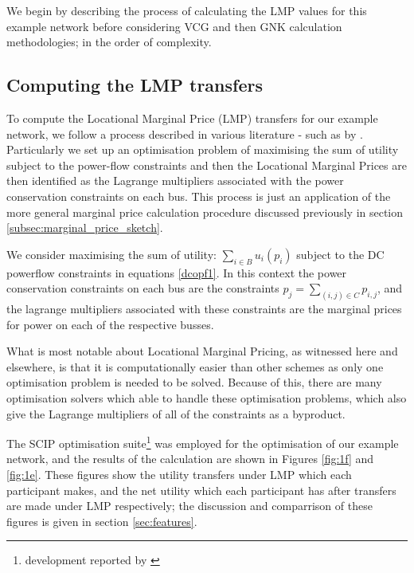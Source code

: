 We begin by describing the process of calculating the LMP values for this example network before considering VCG and then GNK calculation methodologies; in the order of complexity.





\subsection{Computing the LMP transfers}\label{subsec:LMP_compute1}

To compute the Locational Marginal Price (LMP) transfers for our example network, we follow a process described in various literature - such as by \cite{lmp1,lmp2}.
Particularly we set up an optimisation problem of maximising the sum of utility subject to the power-flow constraints and then the Locational Marginal Prices are then identified as the Lagrange multipliers associated with the power conservation constraints on each bus.
This process is just an application of the more general marginal price calculation procedure discussed previously in section \ref{subsec:marginal_price_sketch}.

We consider maximising the sum of utility: $\sum_{i\in B} u_i(p_i)$ subject to the DC powerflow constraints in equations \ref{dcopf1}.
In this context the power conservation constraints on each bus are the constraints $p_j = \sum_{(i,j)\in C}p_{i,j}$, and the lagrange multipliers associated with these constraints are the marginal prices for power on each of the respective busses.

What is most notable about Locational Marginal Pricing, as witnessed here and elsewhere, is that it is computationally easier than other schemes as only one optimisation problem is needed to be solved.
Because of this, there are many optimisation solvers which able to handle these optimisation problems, which also give the Lagrange multipliers of all of the constraints as a byproduct.

The SCIP optimisation suite\footnote{development reported by \cite{MaherFischerGallyetal.2017}} was employed for the optimisation of our example network, and the results of the calculation are shown in Figures \ref{fig:1f} and \ref{fig:1e}.
These figures show the utility transfers under LMP which each participant makes, and the net utility which each participant has after transfers are made under LMP respectively; the discussion and comparrison of these figures is given in section \ref{sec:features}.

